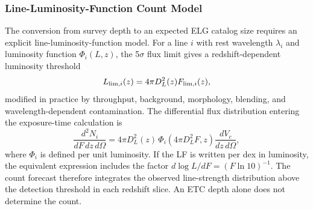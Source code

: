\subsubsection{Line-Luminosity-Function Count Model}

The conversion from survey depth to an expected ELG catalog size requires an explicit line-luminosity-function model. For a line $i$ with rest wavelength $\lambda_i$ and luminosity function $\Phi_i(L,z)$, the 5$\sigma$ flux limit gives a redshift-dependent luminosity threshold
\begin{equation}
  L_{{\rm lim},i}(z)=4\pi D_L^2(z)F_{{\rm lim},i}(z),
\end{equation}
modified in practice by throughput, background, morphology, blending, and wavelength-dependent contamination. The differential flux distribution entering the exposure-time calculation is
\begin{equation}
  \frac{d^2N_i}{dF\,dz\,d\Omega}
  =
  4\pi D_L^2(z)\,
  \Phi_i\!\left(4\pi D_L^2F,z\right)
  \frac{dV_c}{dz\,d\Omega},
\end{equation}
where $\Phi_i$ is defined per unit luminosity. If the LF is written per dex in luminosity, the equivalent expression includes the factor $d\log L/dF=(F\ln10)^{-1}$. The count forecast therefore integrates the observed line-strength distribution above the detection threshold in each redshift slice. An ETC depth alone does not determine the count.

